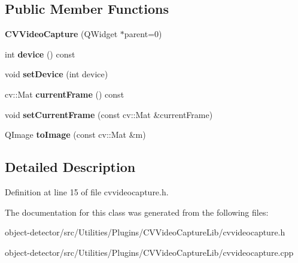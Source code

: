 \subsection*{Public Member Functions}
\begin{DoxyCompactItemize}
\item 
\mbox{\label{class_c_v_video_capture_acd97c41dc5eb80305938e868bb7dddbf}} 
{\bfseries C\+V\+Video\+Capture} (Q\+Widget $\ast$parent=0)
\item 
\mbox{\label{class_c_v_video_capture_ac78117da440fb4ecb6c2904d44e9c534}} 
int {\bfseries device} () const
\item 
\mbox{\label{class_c_v_video_capture_ad1b67ebc004c967fae32effb6853f47f}} 
void {\bfseries set\+Device} (int device)
\item 
\mbox{\label{class_c_v_video_capture_a13bab8080f30daa6efec96d0f12e71cf}} 
cv\+::\+Mat {\bfseries current\+Frame} () const
\item 
\mbox{\label{class_c_v_video_capture_a0c493880e905328d48744d47c85843e6}} 
void {\bfseries set\+Current\+Frame} (const cv\+::\+Mat \&current\+Frame)
\item 
\mbox{\label{class_c_v_video_capture_a6584618b43c71b60f5bc272382d37c2e}} 
Q\+Image {\bfseries to\+Image} (const cv\+::\+Mat \&m)
\end{DoxyCompactItemize}


\subsection{Detailed Description}


Definition at line 15 of file cvvideocapture.\+h.



The documentation for this class was generated from the following files\+:\begin{DoxyCompactItemize}
\item 
object-\/detector/src/\+Utilities/\+Plugins/\+C\+V\+Video\+Capture\+Lib/cvvideocapture.\+h\item 
object-\/detector/src/\+Utilities/\+Plugins/\+C\+V\+Video\+Capture\+Lib/cvvideocapture.\+cpp\end{DoxyCompactItemize}
